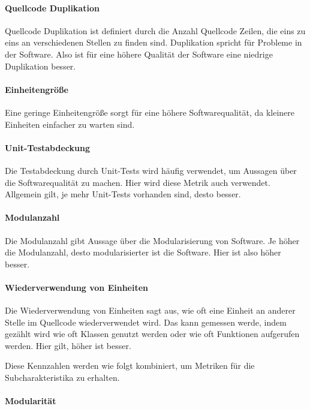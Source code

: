 \documentclass[12pt, a4paper, ngerman]{article}
\begin{document}
\paragraph{Quellcode Duplikation}

Quellcode Duplikation ist definiert durch die Anzahl Quellcode Zeilen,
die eins zu eins an verschiedenen Stellen zu finden sind.
Duplikation spricht für Probleme in der Software.
Also ist für eine höhere Qualität der Software eine niedrige Duplikation besser.

\paragraph{Einheitengröße}

Eine geringe Einheitengröße sorgt für eine höhere Softwarequalität,
da kleinere Einheiten einfacher zu warten sind.

\paragraph{Unit-Testabdeckung}

Die Testabdeckung durch Unit-Tests wird häufig verwendet,
um Aussagen über die Softwarequalität zu machen.
Hier wird diese Metrik auch verwendet.
Allgemein gilt, je mehr Unit-Tests vorhanden sind, desto besser.

\paragraph{Modulanzahl}

Die Modulanzahl gibt Aussage über die Modularisierung von Software.
Je höher die Modulanzahl, desto modularisierter ist die Software.
Hier ist also höher besser.

\paragraph{Wiederverwendung von Einheiten}

Die Wiederverwendung von Einheiten sagt aus,
wie oft eine Einheit an anderer Stelle im Quellcode wiederverwendet wird.
Das kann gemessen werde, indem gezählt wird wie oft Klassen genutzt werden
oder wie oft Funktionen aufgerufen werden.
Hier gilt, höher ist besser.

Diese Kennzahlen werden wie folgt kombiniert,
um Metriken für die Subcharakteristika zu erhalten.

\paragraph{Modularität}
\end{document}

